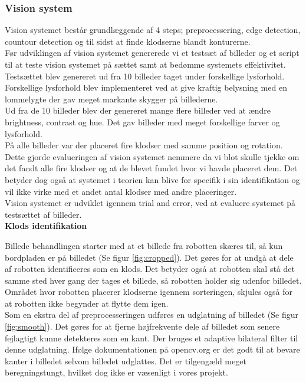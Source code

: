 \subsubsection{Vision system}
Vision systemet består grundlæggende af 4 steps; preprocessering, edge detection, countour detection og til sidst at finde klodserne blandt konturerne. \\

Før udviklingen af vision systemet genererede vi et testsæt af billeder og et script til at teste vision systemet på sættet samt at bedømme systemets effektivitet.
Testsættet blev genereret ud fra 10 billeder taget under forskellige lysforhold.
Forskellige lysforhold blev implementeret ved at give kraftig belysning med en lommelygte der gav meget markante skygger på billederne. \\
Ud fra de 10 billeder blev der genereret mange flere billeder ved at ændre brightness, contrast og hue.
Det gav billeder med meget forskellige farver og lysforhold. \\
På alle billeder var der placeret fire klodser med samme position og rotation.
Dette gjorde evalueringen af vision systemet nemmere da vi blot skulle tjekke om det fandt alle fire klodser og at de blevet fundet hvor vi havde placeret dem.
Det betyder dog også at systemet i teorien kan blive for specifik i sin identifikation og vil ikke virke med et andet antal klodser med andre placeringer. \\

Vision systemet er udviklet igennem trial and error, ved at evaluere systemet på testsættet af billeder. \\

\textbf{Klods identifikation}

Billede behandlingen starter med at et billede fra robotten skæres til, så kun bordpladen er på billedet (Se figur \ref{fig:cropped}).
Det gøres for at undgå at dele af robotten identificeres som en klods.
Det betyder også at robotten skal stå det samme sted hver gang der tages et billede, så robotten holder sig udenfor billedet.
Området hvor robotten placerer klodserne igennem sorteringen, skjules også for at robotten ikke begynder at flytte dem igen. \\

Som en ekstra del af preprocesseringen udføres en udglatning af billedet (Se figur \ref{fig:smooth}).
Det gøres for at fjerne højfrekvente dele af billedet som senere fejlagtigt kunne detekteres som en kant.
Der bruges et adaptive bilateral filter til denne udglatning.
Ifølge dokumentationen på opencv.org er det godt til at bevare kanter i billedet selvom billedet udglattes. Det er tilgengæld meget beregningstungt, hvilket dog ikke er væsenligt i vores projekt. \\

